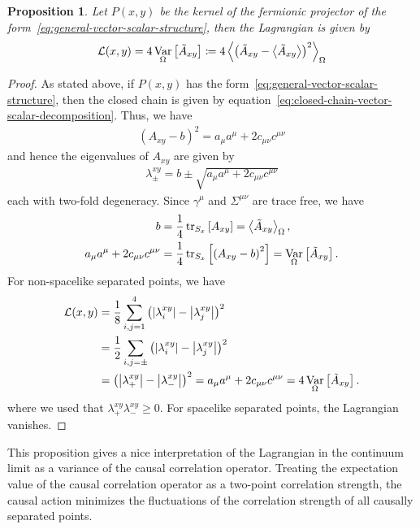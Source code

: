\documentclass[reqno,11pt]{amsart}
\DeclareMathOperator{\Var}{Var}
\newcommand{\defeq}{\coloneqq}
\renewcommand{\L}{{\mathcal{L}}}
\newtheorem{proposition}[definition]{Proposition}
\numberwithin{equation}{section}
\begin{document}
\begin{proposition}
    Let $P(x, y)$ be the kernel of the fermionic projector of the form~\eqref{eq:general-vector-scalar-structure}, then
    the Lagrangian is given by
    \begin{align}
        \L(x, y) = 4 \Var_\Omega \left[ \tilde{A}_{xy} \right] \defeq 4 \expval{\left( \tilde{A}_{xy} - \expval{\tilde{A}_{xy}} \right)^2}_{\Omega}
    \end{align}
\end{proposition}
\begin{proof}
    As stated above, if $P(x, y)$ has the form~\eqref{eq:general-vector-scalar-structure}, then the closed chain is given by
    equation~\eqref{eq:closed-chain-vector-scalar-decomposition}.
    Thus, we have
    \begin{align*}
        \left( A_{xy} - b \right)^2 = a_\mu a^\mu + 2 c_{\mu\nu} c^{\mu\nu}
    \end{align*}
    and hence the eigenvalues of $A_{xy}$ are given by
    \begin{align*}
        \lambda^{xy}_{\pm} = b \pm \sqrt{a_\mu a^\mu + 2 c_{\mu\nu} c^{\mu\nu}}
    \end{align*}
    each with two-fold degeneracy.
    Since $\gamma^\mu$ and $\Sigma^{\mu\nu}$ are trace free, we have
    \begin{align*}
        b &= \frac{1}{4} \tr_{S_x} \left[ A_{xy} \right] = \expval{\tilde{A}_{xy}}_{\Omega}, \\
        a_\mu a^\mu + 2 c_{\mu\nu} c^{\mu\nu} &= \frac{1}{4} \tr_{S_x} \left[ \left( A_{xy} - b \right)^2 \right] = \Var_\Omega \left[ \tilde{A}_{xy} \right].
    \end{align*}
    For non-spacelike separated points, we have
    \begin{align*}
        \L(x, y) &= \frac{1}{8} \sum_{i, j = 1}^{4} \left( \abs{\lambda^{xy}_i} - \abs{\lambda^{xy}_j} \right)^2 \\
        &= \frac{1}{2} \sum_{i, j = \pm} \left( \abs{\lambda^{xy}_i} - \abs{\lambda^{xy}_j} \right)^2 \\
        &= \left( \abs{\lambda^{xy}_+} - \abs{\lambda^{xy}_-} \right)^2 = a_\mu a^\mu + 2 c_{\mu\nu} c^{\mu\nu} = 4 \Var_\Omega \left[ \tilde{A}_{xy} \right].
    \end{align*}
    where we used that $\lambda^{xy}_+ \lambda^{xy}_- \geq 0$.
    For spacelike separated points, the Lagrangian vanishes.
\end{proof}

This proposition gives a nice interpretation of the Lagrangian in the continuum limit as a variance of the causal correlation operator.
Treating the expectation value of the causal correlation operator as a two-point correlation strength, the causal action minimizes
the fluctuations of the correlation strength of all causally separated points.
\end{document}
